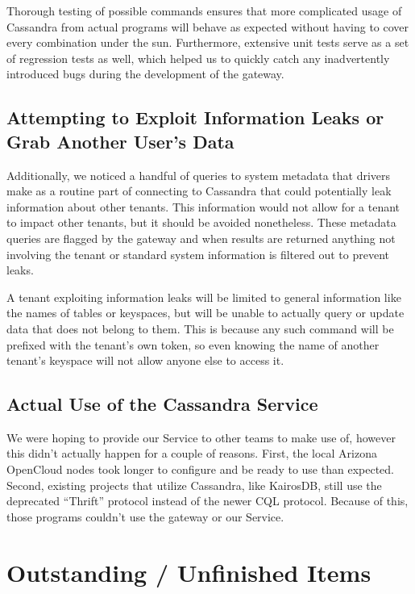 \documentclass[11pt,notitlepage]{report}
\begin{document}
Thorough testing of possible commands ensures that more complicated usage of Cassandra from actual programs will behave as expected without having to cover every combination under the sun. Furthermore, extensive unit tests serve as a set of regression tests as well, which helped us to quickly catch any inadvertently introduced bugs during the development of the gateway.

\section*{Attempting to Exploit Information Leaks or Grab Another User's Data}

Additionally, we noticed a handful of queries to system metadata that drivers make as a routine part of connecting to Cassandra that could potentially leak information about other tenants. This information would not allow for a tenant to impact other tenants, but it should be avoided nonetheless. These metadata queries are flagged by the gateway and when results are returned anything not involving the tenant or standard system information is filtered out to prevent leaks.

A tenant exploiting information leaks will be limited to general information like the names of tables or keyspaces, but will be unable to actually query or update data that does not belong to them. This is because any such command will be prefixed with the tenant's own token, so even knowing the name of another tenant's keyspace will not allow anyone else to access it.


\section*{Actual Use of the Cassandra Service}

We were hoping to provide our Service to other teams to make use of, however this didn't actually happen for a couple of reasons. First, the local Arizona OpenCloud nodes took longer to configure and be ready to use than expected. Second, existing projects that utilize Cassandra, like KairosDB, still use the deprecated ``Thrift'' protocol instead of the newer CQL protocol. Because of this, those programs couldn't use the gateway or our Service.


\chapter*{Outstanding / Unfinished Items}
\end{document}

